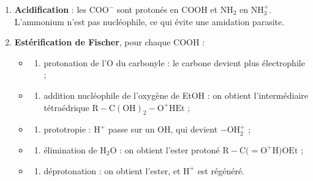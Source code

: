 \documentclass[11pt,a4paper]{article}
\providecommand{\tightlist}{\setlength{\itemsep}{0pt}\setlength{\parskip}{0pt}}
\begin{document}
\begin{enumerate}
\def\labelenumi{\arabic{enumi}.}
\tightlist
\item
  \textbf{Acidification} : les \(\mathrm{COO^-}\) sont protonés en COOH et \(\mathrm{NH_2}\) en \(\mathrm{NH_3^+}\). L'ammonium n'est pas nucléophile, ce qui évite une amidation parasite.
\item
  \textbf{Estérification de Fischer}, pour chaque COOH :

  \begin{itemize}
  \item
    \begin{enumerate}
    \def\labelenumii{(\alph{enumii})}
    \tightlist
    \item
      protonation de l'O du carbonyle : le carbone devient plus électrophile ;
    \end{enumerate}
  \item
    \begin{enumerate}
    \def\labelenumii{(\alph{enumii})}
    \setcounter{enumii}{1}
    \tightlist
    \item
      addition nucléophile de l'oxygène de EtOH : on obtient l'intermédiaire tétraédrique \(\mathrm{R{-}C(OH)_2{-}O^+HEt}\) ;
    \end{enumerate}
  \item
    \begin{enumerate}
    \def\labelenumii{(\alph{enumii})}
    \setcounter{enumii}{2}
    \tightlist
    \item
      prototropie : \(\mathrm{H^+}\) passe sur un OH, qui devient \(\mathrm{{-}OH_2^+}\) ;
    \end{enumerate}
  \item
    \begin{enumerate}
    \def\labelenumii{(\alph{enumii})}
    \setcounter{enumii}{3}
    \tightlist
    \item
      élimination de \(\mathrm{H_2O}\) : on obtient l'ester protoné \(\mathrm{R{-}C(} = \mathrm{O^+H)OEt}\) ;
    \end{enumerate}
  \item
    \begin{enumerate}
    \def\labelenumii{(\alph{enumii})}
    \setcounter{enumii}{4}
    \tightlist
    \item
      déprotonation : on obtient l'ester, et \(\mathrm{H^+}\) est régénéré.
    \end{enumerate}
  \end{itemize}
\end{enumerate}
\end{document}
